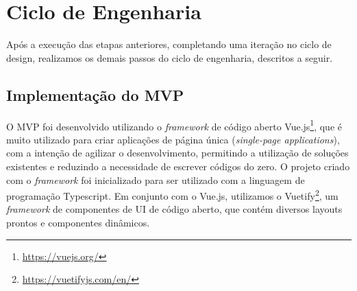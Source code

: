 


\section{Ciclo de Engenharia}

Após a execução das etapas anteriores, completando uma iteração no ciclo de design, realizamos os demais passos do ciclo de engenharia, descritos a seguir.

\subsection{Implementação do MVP}
O MVP foi desenvolvido utilizando o \textit{framework} de código aberto Vue.js\footnote{\url{https://vuejs.org/}}, que é muito utilizado para criar aplicações de página única (\textit{single-page applications}), com a intenção de agilizar o desenvolvimento, permitindo a utilização de soluções existentes e reduzindo a necessidade de escrever códigos do zero. O projeto criado com o \textit{framework} foi inicializado para ser utilizado com a linguagem de programação Typescript. Em conjunto com o Vue.js, utilizamos o Vuetify\footnote{\url{https://vuetifyjs.com/en/}}, um \textit{framework} de componentes de UI de código aberto, que contém diversos layouts prontos e componentes dinâmicos.


